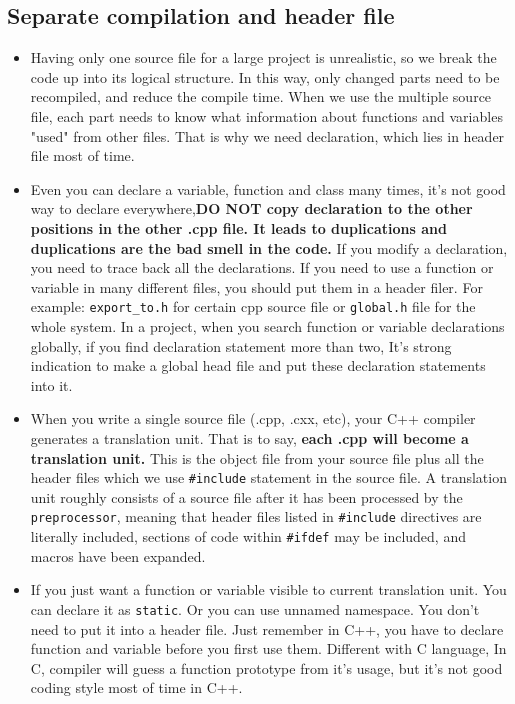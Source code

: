 \documentclass[a4paper,11pt,twoside]{book}
\begin{document}
\subsection{Separate compilation and header file}
\begin{itemize}
	\item Having only one source file for a large project is unrealistic, so we break the code up into its logical structure. In this way, only changed parts need to be recompiled, and reduce the compile time. When we use the multiple source file, each part needs to know what information about functions and variables "used" from other files. That is why we need declaration, which lies in header file most of time.
	
	\item Even you can declare a variable, function and class many times, it's not good way to declare everywhere,\textbf{DO NOT copy declaration to the other positions in the other .cpp file. It leads to duplications and duplications are the bad smell in the code.} If you modify a declaration, you need to trace back all the declarations. If you need to use a function or variable in many different files, you should put them in a header filer. For example: \texttt{export\_to.h} for certain cpp source file or \texttt{global.h} file for the whole system. In a project, when you search function or variable declarations globally, if you find declaration statement more than two, It's strong indication to make a global head file and put these declaration statements into it.

	\item When you write a single source file (.cpp, .cxx, etc), your C++ compiler generates a translation unit. That is to say, \textbf{each .cpp will become a translation unit.} This is the object file from your source file plus all the header files which we use \texttt{\#include} statement in the source file.  A translation unit roughly consists of a source file after it has been processed by the \texttt{preprocessor}, meaning that header files listed in \texttt{\#include} directives are literally included, sections of code within \texttt{\#ifdef} may be included, and macros have been expanded.
	
	\item If you just want a function or variable visible to current translation unit. You can declare it as \texttt{static}. Or you can use unnamed namespace.  You don't need to put it into a header file.  Just remember in C++, you have to declare function and variable before you first use them. Different with C language, In C, compiler will guess a function prototype from it's usage, but it's not good coding style most of time in C++.
	

\end{itemize}
\end{document}

